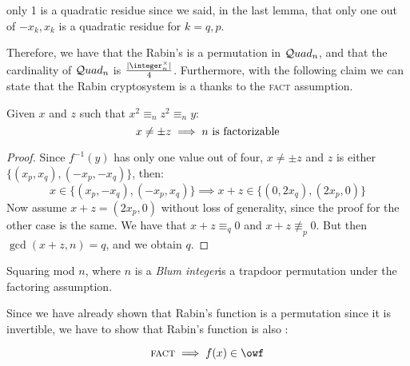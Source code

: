 only 1 is a quadratic residue since we said, in the last lemma, that only one out of $-x_k, x_k$ is a quadratic residue for $k = q,p$.

Therefore, we have that the Rabin's \tdp{} is a permutation in $\mathcal{Q}uad_n$, and that the cardinality of $\mathcal{Q}uad_n$ is $\frac{|\integer_n^\times|}{4}$. Furthermore, with the following claim we can state that the Rabin cryptosystem is a \owf{} thanks to the \textsc{fact} assumption.

\begin{claim}
    Given $x$ and $z$ such that $x^2 \equiv_n z^2 \equiv_n y$:
    \[
        x \neq \pm z \implies n \text{\textup{ is factorizable}}
    \]
\end{claim}

\begin{proof}
    Since $f^{-1}(y)$ has only one value out of four, $x \neq \pm z$ and $z$ is either $\{(x_p, x_q), (-x_p, -x_q)\}$, then:
    \[
        x \in \{(x_p, -x_q), (-x_p, x_q)\} \implies x + z \in \{(0, 2x_q), (2x_p, 0)\}
    \]
    Now assume $x + z = (2x_p, 0)$ without loss of generality, since the proof for the other case is the same. We have that $x + z \equiv_q 0$ and $x + z \not\equiv_p 0$. But then $\gcd(x + z, n) = q$, and we obtain $q$.
\end{proof}

\begin{theorem}
    Squaring mod $n$, where $n$ is a \emph{Blum integer}\footnotemark is a trapdoor permutation under the factoring assumption.
\end{theorem}


Since we have already shown that Rabin's function is a permutation since it is invertible, we have to show that Rabin's function is also \owf:

\begin{proposition}
\[
    \textsc{fact} \implies f(x) \in \owf \qedhere
\]
\end{proposition}

